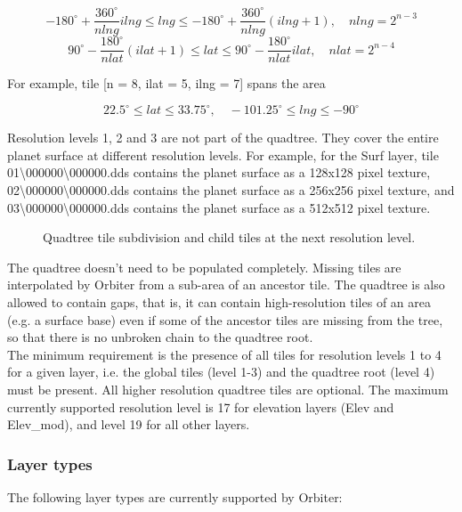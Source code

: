 \documentclass[Orbiter Developer Manual.tex]{subfiles}
\begin{document}
\[ -180^{\circ} + \frac{360^{\circ}}{nlng}ilng \leq lng \leq -180^{\circ} + \frac{360^{\circ}}{nlng}(ilng + 1), \quad nlng = 2^{n - 3} \]
\[ 90^{\circ} - \frac{180^{\circ}}{nlat}(ilat + 1) \leq lat \leq 90^{\circ} - \frac{180^{\circ}}{nlat}ilat, \quad nlat = 2^{n - 4} \]

\noindent
For example, tile [n = 8, ilat = 5, ilng = 7] spans the area

\[ 22.5^{\circ} \leq lat \leq 33.75^{\circ}, \quad -101.25^{\circ} \leq lng \leq -90^{\circ} \]

\noindent
Resolution levels 1, 2 and 3 are not part of the quadtree. They cover the entire planet surface at different resolution levels. For example, for the Surf layer, tile 01\textbackslash 000000\textbackslash 000000.dds contains the planet surface as a 128x128 pixel texture, 02\textbackslash 000000\textbackslash 000000.dds contains the planet surface as a 256x256 pixel texture, and  03\textbackslash 000000\textbackslash 000000.dds contains the planet surface as a 512x512 pixel texture.

\begin{figure}[H]
	\centering
	\caption{Quadtree tile subdivision and child tiles at the next resolution level.}
\end{figure}

\noindent
The quadtree doesn't need to be populated completely. Missing tiles are interpolated by Orbiter from a sub-area of an ancestor tile. The quadtree is also allowed to contain gaps, that is, it can contain high-resolution tiles of an area (e.g. a surface base) even if some of the ancestor tiles are missing from the tree, so that there is no unbroken chain to the quadtree root.\\
The minimum requirement is the presence of all tiles for resolution levels 1 to 4 for a given layer, i.e. the global tiles (level 1-3) and the quadtree root (level 4) must be present. All higher resolution quadtree tiles are optional. The maximum currently supported resolution level is 17 for elevation layers (Elev and Elev\_mod), and level 19 for all other layers.



\subsubsection{Layer types}
The following layer types are currently supported by Orbiter:\\
\end{document}
